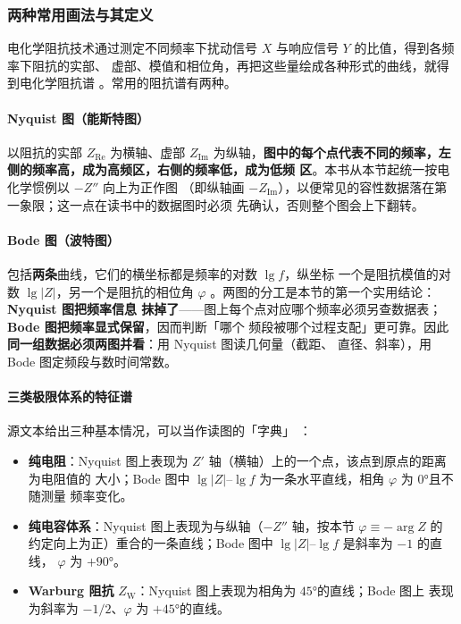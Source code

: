 \subsubsection{两种常用画法与其定义}

电化学阻抗技术通过测定不同频率下扰动信号 $X$ 与响应信号 $Y$ 的比值，得到各频率下阻抗的实部、
虚部、模值和相位角，再把这些量绘成各种形式的曲线，就得到电化学阻抗谱
。常用的阻抗谱有两种。

\paragraph{Nyquist 图（能斯特图）} 以阻抗的实部 $Z_{\mathrm{Re}}$ 为横轴、虚部 $Z_{\mathrm{Im}}$
为纵轴，\textbf{图中的每个点代表不同的频率，左侧的频率高，成为高频区，右侧的频率低，成为低频
区}。本书从本节起统一按电化学惯例以 $-Z''$ 向上为正作图
（即纵轴画 $-Z_{\mathrm{Im}}$），以便常见的容性数据落在第一象限；这一点在读书中的数据图时必须
先确认，否则整个图会上下翻转。

\paragraph{Bode 图（波特图）} 包括\textbf{两条}曲线，它们的横坐标都是频率的对数 $\lg f$，纵坐标
一个是阻抗模值的对数 $\lg\lvert Z\rvert$，另一个是阻抗的相位角 $\varphi$
。两图的分工是本节的第一个实用结论：\textbf{Nyquist 图把频率信息
抹掉了}——图上每个点对应哪个频率必须另查数据表；\textbf{Bode 图把频率显式保留}，因而判断「哪个
频段被哪个过程支配」更可靠。因此\textbf{同一组数据必须两图并看}：用 Nyquist 图读几何量（截距、
直径、斜率），用 Bode 图定频段与数时间常数。

\paragraph{三类极限体系的特征谱} 源文本给出三种基本情况，可以当作读图的「字典」
：

\begin{itemize}
\item \textbf{纯电阻}：Nyquist 图上表现为 $Z'$ 轴（横轴）上的一个点，该点到原点的距离为电阻值的
大小；Bode 图中 $\lg\lvert Z\rvert$–$\lg f$ 为一条水平直线，相角 $\varphi$ 为 $0$°且不随测量
频率变化。
\item \textbf{纯电容体系}：Nyquist 图上表现为与纵轴（$-Z''$ 轴，按本节 $\varphi\equiv-\arg Z$ 的
约定向上为正）重合的一条直线；Bode 图中 $\lg\lvert Z\rvert$–$\lg f$ 是斜率为 $-1$ 的直线，
$\varphi$ 为 $+90$°。
\item \textbf{Warburg 阻抗} $Z_{\mathrm{W}}$：Nyquist 图上表现为相角为 $45$°的直线；Bode 图上
表现为斜率为 $-1/2$、$\varphi$ 为 $+45$°的直线。
\end{itemize}

